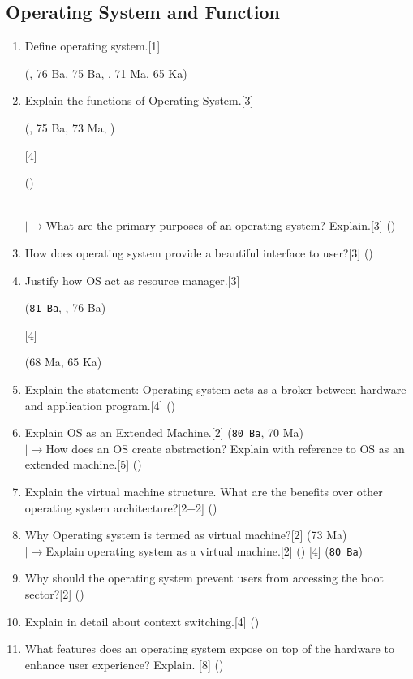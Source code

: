 \documentclass[12pt]{article}
\newcommand{\lb}{\\$\left|\rightarrow\right.$}
\begin{document}
	\subsection{Operating System and Function}
	\begin{enumerate}
	\item Define operating system.\hfill[1] \begin{footnotesize}(, 76 Ba, 75 Ba, , 71 Ma, 65 Ka)\end{footnotesize}
	\item Explain the functions of Operating System.\hfill[3] \begin{footnotesize}(, 75 Ba, 73 Ma, )\end{footnotesize} [4] \begin{footnotesize}()\end{footnotesize} 
	\lb What are the primary purposes of an operating system? Explain.\hfill[3] ()
	\item How does operating system provide a beautiful interface to user?\hfill[3] ()
	\item Justify how OS act as resource manager.\hfill[3]\begin{small} (\texttt{81 Ba}, , 76 Ba)\end{small} [4]\begin{small} (68 Ma, 65 Ka)\end{small}
	\item Explain the statement: Operating system acts as a broker between hardware and application program.\hfill[4] ()
	\item Explain OS as an Extended Machine.\hfill[2] (\texttt{80 Ba}, 70 Ma)
	\lb How does an OS create abstraction? Explain with reference to OS as an extended machine.\hspace{13.4cm}[5] ()
	\item Explain the virtual machine structure. What are the benefits over other operating system architecture?\hfill[2+2] ()
	\item Why Operating system is termed as virtual machine?\hfill[2] (73 Ma)
	\lb Explain operating system as a virtual machine.\hfill[2] () [4] (\texttt{80 Ba})

	\item Why should the operating system prevent users from accessing the boot sector?\hfill[2] ()
	\item Explain in detail about context switching.\hfill[4] ()
	\item What features does an operating system expose on top of the hardware to enhance user experience? Explain. \hfill[8] ()
	\end{enumerate}
\end{document}

